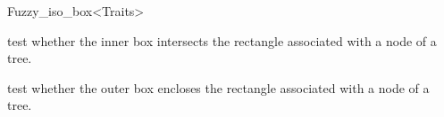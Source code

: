 \begin{ccRefClass}{Fuzzy_iso_box<Traits>}
\ccOperations


{test whether the inner box intersects the rectangle
associated with a node of a tree.}

{test whether the outer box encloses the rectangle associated with a node of a tree.}

\ccSeeAlso


\end{ccRefClass}


